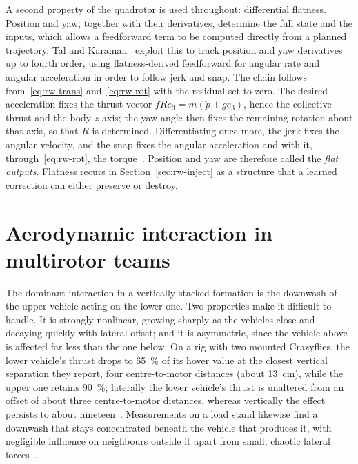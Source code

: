 A second property of the quadrotor is used throughout: differential flatness. Position and yaw,
together with their derivatives, determine the full state and the inputs, which allows a
feedforward term to be computed directly from a planned trajectory. Tal and
Karaman~\cite{tal2018indi} exploit this to track position and yaw derivatives up to fourth order,
using flatness-derived feedforward for angular rate and angular acceleration in order to follow
jerk and snap.
The chain follows from~\eqref{eq:rw-trans} and~\eqref{eq:rw-rot} with the residual set to zero. The
desired acceleration fixes the thrust vector $f R e_3 = m(\ddot p + g e_3)$, hence the collective
thrust and the body $z$-axis; the yaw angle then fixes the remaining rotation about that axis, so
that $R$ is determined. Differentiating once more, the jerk fixes the angular velocity, and the
snap fixes the angular acceleration and with it, through~\eqref{eq:rw-rot}, the
torque~\cite{tal2018indi,hsieh2026flatness}. Position and yaw are therefore called the \emph{flat
outputs}. Flatness recurs in Section~\ref{sec:rw-inject} as a structure that a learned
correction can either preserve or destroy.

\section{Aerodynamic interaction in multirotor teams}
\label{sec:rw-physics}

The dominant interaction in a vertically stacked formation is the downwash of the upper vehicle
acting on the lower one. Two properties make it difficult to handle. It is strongly nonlinear,
growing sharply as the vehicles close and decaying quickly with lateral offset; and it is
asymmetric, since the vehicle above is affected far less than the one below. On a rig with two
mounted Crazyflies, the lower vehicle's thrust drops to \SI{65}{\percent} of its hover value at
the closest vertical separation they report, four centre-to-motor distances (about
\SI{13}{\centi\metre}), while the upper one retains
\SI{90}{\percent}; laterally the lower vehicle's thrust is unaltered from an offset of about three
centre-to-motor distances, whereas vertically the effect persists to about nineteen~\cite{kiran2025downwash}.
Measurements on a load stand likewise find a downwash that stays concentrated beneath the vehicle
that produces it, with negligible influence on neighbours outside it apart from small, chaotic
lateral forces~\cite{gielis2023aggregate}.

